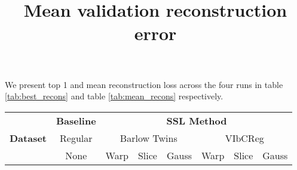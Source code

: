 \documentclass[../../thesis.tex]{subfiles}
\begin{document}
We present top 1 and mean reconstruction loss across the four runs in table \ref{tab:best_recons} and table \ref{tab:mean_recons} respectively.

\begin{table}[H]
    \centering
    \title{Mean validation reconstruction error}
    \begin{adjustbox}{width=\textwidth}
    \begin{tabular}{lc|c|c|c|c|c|c} %
        \toprule
        \multirow{3}{*}{\textbf{Dataset}} & \multicolumn{1}{c}{\textbf{Baseline}} & \multicolumn{6}{c}{\textbf{SSL Method}} \\
                                         \cmidrule(lr){3-8}
                                          & \multicolumn{1}{c}{Regular}           & \multicolumn{3}{c}{Barlow Twins}    &  \multicolumn{3}{c}{VIbCReg} \\
                                                                                   \cmidrule(lr){3-5}                    \cmidrule(lr){6-8}
                                          &   None                                & Warp  & Slice & Gauss               & Warp & Slice & Gauss \\
                            

\end{tabular}
\end{adjustbox}
\end{table}
\end{document}
